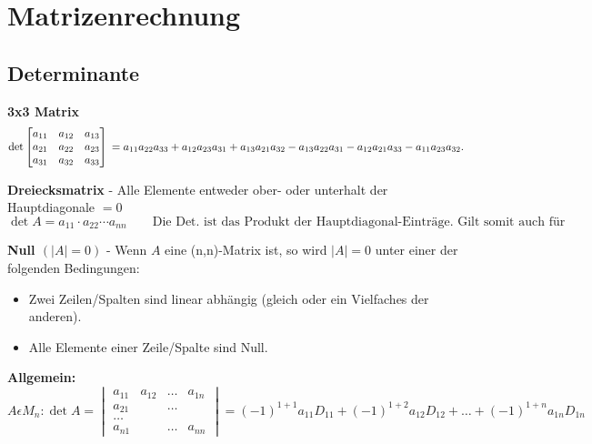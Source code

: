 \section{Matrizenrechnung}
\scriptsize


\subsection{Determinante}

	\textbf{3x3 Matrix}
	$$ \det \begin{bmatrix} a_{11} & a_{12} & a_{13} \\ a_{21} & a_{22}& a_{23} \\
	a_{31} & a_{32} & a_{33} \end{bmatrix} \\ = a_{11} a_{22} a_{33} + a_{12}
	a_{23} a_{31} + a_{13} a_{21} a_{32} - a_{13} a_{22} a_{31} - a_{12} a_{21}
	a_{33} - a_{11} a_{23} a_{32}.  $$
	
	\textbf{Dreiecksmatrix} - Alle Elemente entweder ober- oder unterhalt der Hauptdiagonale $= 0$
	$$\det A =a_{11}\cdot a_{22}\dotsb a_{nn} \quad  \quad \text{Die Det. ist das Produkt
	der Hauptdiagonal-Einträge. Gilt somit auch für Diagonalmatritzen.} $$
	
	\textbf{Null $(|A| = 0)$} - Wenn $A$ eine (n,n)-Matrix ist, so wird $|A| = 0$ unter einer der
	folgenden Bedingungen:
	\begin{itemize}
    	\item Zwei Zeilen/Spalten sind linear abhängig (gleich oder ein Vielfaches der anderen).
    	\item Alle Elemente einer Zeile/Spalte sind Null. \\
  	\end{itemize} 
	
	\textbf{Allgemein:}
	$$A\epsilon M_n: \det A =    
	\begin{vmatrix}
    	a_{11} & a_{12}& \ldots & a_{1n}\\
    	a_{21}& &\ldots & \\
    	\ldots \\
    	a_{n1} & & \ldots & a_{nn}    			
    \end{vmatrix}=
	(-1)^{1+1}a_{11}D_{11} + (-1)^{1+2}a_{12}D_{12}+ \ldots +
	(-1)^{1+n}a_{1n}D_{1n}$$
	
